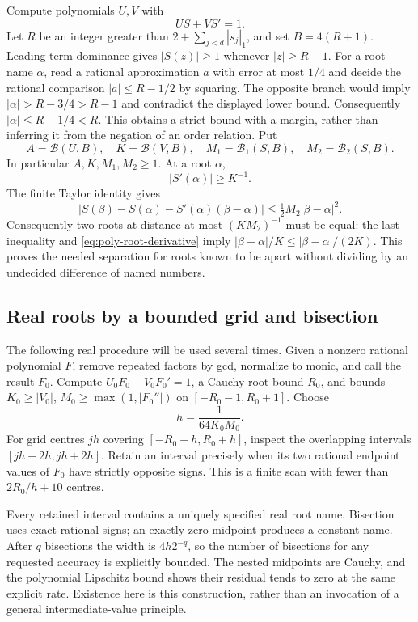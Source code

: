 Compute polynomials $U,V$ with
\begin{equation}
                       US+VS'=1.                    \label{eq:poly-bezout}
\end{equation}
Let $R$ be an integer greater than $2+\sum_{j<d}|s_j|_1$, and set
$B=4(R+1)$. Leading-term dominance gives $|S(z)|\ge1$ whenever
$|z|\ge R-1$. For a root name $\alpha$, read a rational approximation
$a$ with error at most $1/4$ and decide the rational comparison
$|a|\le R-1/2$ by squaring. The opposite branch would imply
$|\alpha|>R-3/4>R-1$ and contradict the displayed lower bound.
Consequently $|\alpha|\le R-1/4<R$. This obtains a strict bound with
a margin, rather than inferring it from the negation of an order relation.
Put
\[
 A=\mathcal B(U,B),\quad K=\mathcal B(V,B),\quad
 M_1=\mathcal B_1(S,B),\quad M_2=\mathcal B_2(S,B).
\]
In particular $A,K,M_1,M_2\ge1$. At a root $\alpha$,
\begin{equation}
                  |S'(\alpha)|\ge K^{-1}.            \label{eq:poly-root-derivative}
\end{equation}
The finite Taylor identity gives
\[
 |S(\beta)-S(\alpha)-S'(\alpha)(\beta-\alpha)|
       \le\tfrac12 M_2|\beta-\alpha|^2.
\]
Consequently two roots at distance at most $(KM_2)^{-1}$ must be equal:
the last inequality and \eqref{eq:poly-root-derivative} imply
$|\beta-\alpha|/K\le |\beta-\alpha|/(2K)$.
This proves the needed separation for roots known to be apart without
dividing by an undecided difference of named numbers.

\subsection{Real roots by a bounded grid and bisection}

The following real procedure will be used several times. Given a nonzero
rational polynomial $F$, remove repeated factors by gcd, normalize to monic,
and call the result $F_0$. Compute $U_0F_0+V_0F_0'=1$, a Cauchy root bound
$R_0$, and bounds $K_0\ge |V_0|$, $M_0\ge\max(1,|F_0''|)$ on
$[-R_0-1,R_0+1]$. Choose
\[
                       h=\frac1{64K_0M_0}.
\]
For grid centres $jh$ covering $[-R_0-h,R_0+h]$, inspect the overlapping
intervals $[jh-2h,jh+2h]$. Retain an interval precisely when its two rational
endpoint values of $F_0$ have strictly opposite signs. This is a finite
scan with fewer than $2R_0/h+10$ centres.

Every retained interval contains a uniquely specified real root name.
Bisection uses exact rational signs; an exactly zero midpoint produces a
constant name. After $q$ bisections the width is $4h2^{-q}$, so the number
of bisections for any requested accuracy is explicitly bounded. The nested
midpoints are Cauchy, and the polynomial Lipschitz bound shows their
residual tends to zero at the same explicit rate. Existence here is this
construction, rather than an invocation of a general intermediate-value
principle.

